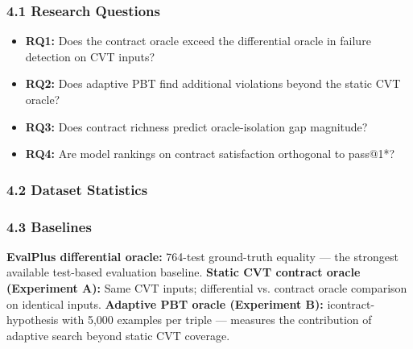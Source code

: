 
\subsubsection{4.1 Research Questions}

\begin{itemize}
\item \textbf{RQ1:} Does the contract oracle exceed the differential oracle in failure detection on CVT inputs?
\item \textbf{RQ2:} Does adaptive PBT find additional violations beyond the static CVT oracle?
\item \textbf{RQ3:} Does contract richness predict oracle-isolation gap magnitude?
\item \textbf{RQ4:} Are model rankings on contract satisfaction orthogonal to pass@1*?
\end{itemize}

\subsubsection{4.2 Dataset Statistics}

\begin{table}[htbp]
\centering
{}
\end{table}

\subsubsection{4.3 Baselines}

\textbf{EvalPlus differential oracle:} 764-test ground-truth equality --- the strongest available test-based evaluation baseline.  
\textbf{Static CVT contract oracle (Experiment A):} Same CVT inputs; differential vs. contract oracle comparison on identical inputs.  
\textbf{Adaptive PBT oracle (Experiment B):} icontract-hypothesis with 5,000 examples per triple --- measures the contribution of adaptive search beyond static CVT coverage.

